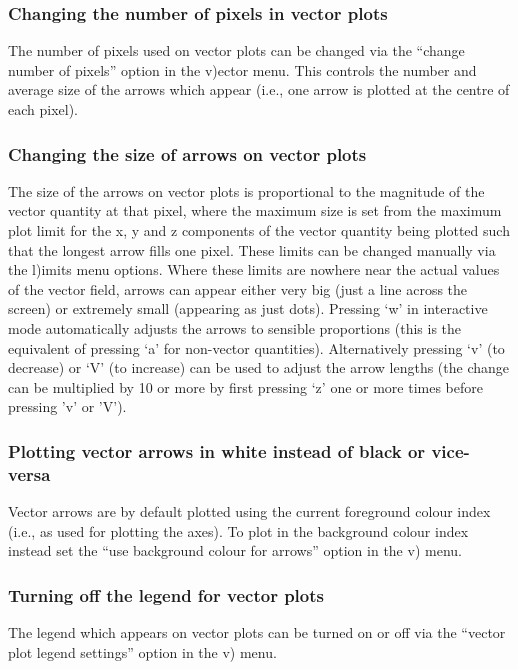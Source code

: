 \documentclass[a4paper,10pt]{article}
\begin{document}
\subsubsection{ Changing the number of pixels in vector plots}
\label{sec:vecpix}
 The number of pixels used on vector plots can be changed via the ``change number of pixels'' option in the v)ector menu. This controls the number and average size of the arrows which appear (i.e., one arrow is plotted at the centre of each pixel).

\subsubsection{ Changing the size of arrows on vector plots}
 The size of the arrows on vector plots is proportional to the magnitude of the vector quantity at that pixel, where the maximum size is set from the maximum plot limit for the x, y and z components of the vector quantity being plotted such that the longest arrow fills one pixel. These limits can be changed manually via the l)imits menu options. Where these limits are nowhere near the actual values of the vector field, arrows can appear either very big (just a line across the screen) or extremely small (appearing as just dots). Pressing `w' in interactive mode automatically adjusts the arrows to sensible proportions (this is the equivalent of pressing `a' for non-vector quantities). Alternatively pressing `v' (to decrease) or `V' (to increase) can be used to adjust the arrow lengths (the change can be multiplied by 10 or more by first pressing `z' one or more times before pressing 'v' or 'V').

\subsubsection{ Plotting vector arrows in white instead of black or vice-versa}
 Vector arrows are by default plotted using the current foreground colour index (i.e., as used for plotting the axes). To plot in the background colour index instead set the ``use background colour for arrows'' option in the v) menu.

\subsubsection{ Turning off the legend for vector plots}
 The legend which appears on vector plots can be turned on or off via the ``vector plot legend settings'' option in the v) menu.
\end{document}
